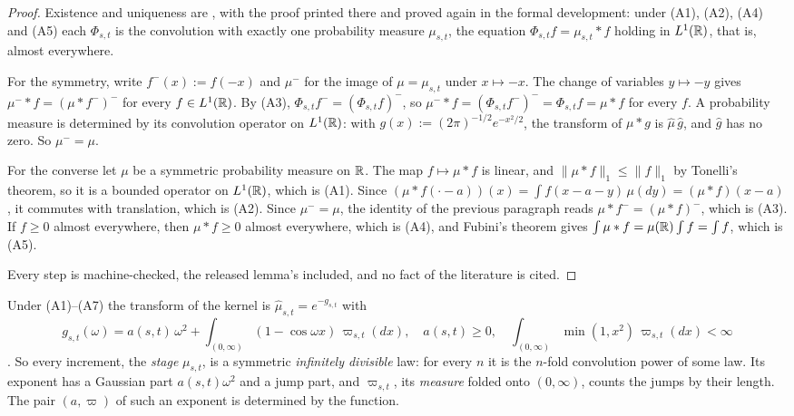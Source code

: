 \begin{proof}
\leanok
Existence and uniqueness are , with the proof printed there
and proved again in the formal development:
under (A1), (A2), (A4) and (A5) each $\Phi_{s,t}$ is the convolution with exactly one probability
measure $\mu_{s,t}$, the equation $\Phi_{s,t}f = \mu_{s,t} * f$ holding in $L^1(\mathbb{R})$, that is,
almost everywhere.

For the symmetry, write $f^-(x) := f(-x)$ and $\mu^-$ for the image of $\mu = \mu_{s,t}$
under $x \mapsto -x$. The change of variables $y \mapsto -y$ gives
$\mu^- * f = (\mu * f^-)^-$ for every $f \in L^1(\mathbb{R})$. By (A3),
$\Phi_{s,t}f^- = (\Phi_{s,t}f)^-$, so $\mu^- * f = (\Phi_{s,t}f^-)^- =
\Phi_{s,t}f = \mu * f$ for every $f$. A probability measure is determined by its convolution
operator on $L^1(\mathbb{R})$: with $g(x) := (2\pi)^{-1/2}e^{-x^2/2}$, the transform of $\mu * g$ is
$\widehat\mu\,\widehat g$, and $\widehat g$ has no zero. So $\mu^- = \mu$.

For the converse let $\mu$ be a symmetric probability measure on $\mathbb{R}$. The map
$f \mapsto \mu * f$ is linear, and $\|\mu * f\|_1 \le \|f\|_1$ by Tonelli's theorem, so it is a
bounded operator on $L^1(\mathbb{R})$, which is (A1). Since
$(\mu * f(\cdot - a))(x) = \int f(x - a - y)\,\mu(dy) = (\mu * f)(x - a)$, it commutes with
translation, which is (A2). Since $\mu^- = \mu$, the identity of the previous paragraph reads
$\mu * f^- = (\mu * f)^-$, which is (A3). If $f \ge 0$ almost everywhere, then
$\mu * f \ge 0$ almost everywhere, which is (A4), and Fubini's theorem gives
$\int \mu * f = \mu(\mathbb{R})\int f = \int f$, which is (A5).

Every step is machine-checked, the released lemma's included, and no fact of the literature is
cited.
\end{proof}

Under (A1)--(A7) the transform of the kernel is $\widehat\mu_{s,t} = e^{-g_{s,t}}$ with
\[
  g_{s,t}(\omega) = a(s,t)\,\omega^2 + \int_{(0,\infty)}(1 - \cos\omega x)\,\varpi_{s,t}(dx),
  \quad a(s,t) \ge 0, \quad \int_{(0,\infty)}\min(1, x^2)\,\varpi_{s,t}(dx) < \infty
\]
. So every increment, the \emph{stage} $\mu_{s,t}$, is a
symmetric \emph{infinitely divisible} law: for every $n$ it is the $n$-fold convolution power of
some law. Its exponent has a Gaussian part $a(s,t)\omega^2$ and a jump part, and $\varpi_{s,t}$,
its \emph{\Levy{} measure} folded onto $(0,\infty)$, counts the jumps by their length. The pair
$(a, \varpi)$ of such an exponent is determined by the function.

